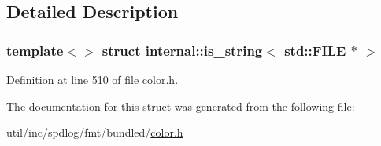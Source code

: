 \subsection{Detailed Description}
\subsubsection*{template$<$$>$\newline
struct internal\+::is\+\_\+string$<$ std\+::\+F\+I\+L\+E $\ast$ $>$}



Definition at line 510 of file color.\+h.



The documentation for this struct was generated from the following file\+:\begin{DoxyCompactItemize}
\item 
util/inc/spdlog/fmt/bundled/\hyperlink{color_8h}{color.\+h}\end{DoxyCompactItemize}
